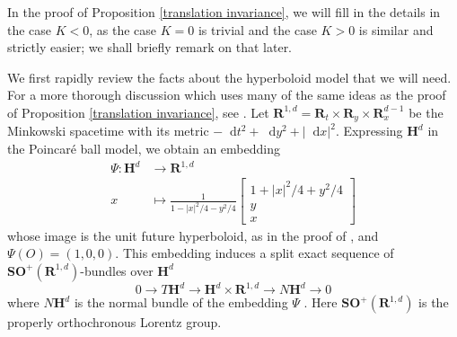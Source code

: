 \documentclass[reqno,10pt]{amsart}
\newcommand{\RR}{\mathbf{R}}
\newcommand{\Hyp}{\mathbf H}
\newcommand{\SpOrth}{\mathbf{SO}}
\newcommand*\dif{\mathop{}\!\mathrm{d}}
\theoremstyle{definition}
\numberwithin{equation}{section}
\begin{document}
In the proof of Proposition \ref{translation invariance}, we will fill in the details in the case $K < 0$, as the case $K = 0$ is trivial and the case $K > 0$ is similar and strictly easier; we shall briefly remark on that later.

We first rapidly review the facts about the hyperboloid model that we will need.
For a more thorough discussion which uses many of the same ideas as the proof of Proposition \ref{translation invariance}, see \cite[\S3.1, \S4.1]{daskalopoulosPrep1}.
Let $\RR^{1, d} = \RR_t \times \RR_y \times \RR_x^{d - 1}$ be the Minkowski spacetime with its metric $-\dif t^2 + \dif y^2 + |\dif x|^2$.
Expressing $\Hyp^d$ in the Poincar\'e ball model, we obtain an embedding
\begin{align*}
\Psi: \Hyp^d &\to \RR^{1, d} \\
x &\mapsto \frac{1}{1 - |x|^2/4 - y^2/4} \begin{bmatrix}1 + |x|^2/4 + y^2/4\\y \\ x\end{bmatrix}
\end{align*}
whose image is the unit future hyperboloid, as in the proof of \cite[Proposition 3.5]{lee1997riemannian}, and $\Psi(O) = (1, 0, 0)$.
This embedding induces a split exact sequence of $\SpOrth^+(\RR^{1, d})$-bundles over $\Hyp^d$
\begin{equation}\label{splitting of tangent bundle}
0 \to T\Hyp^d \to \Hyp^d \times \RR^{1, d} \to N\Hyp^d \to 0
\end{equation}
where $N\Hyp^d$ is the normal bundle of the embedding $\Psi$ \cite[(3.4)]{daskalopoulosPrep1}.
Here $\SpOrth^+(\RR^{1, d})$ is the properly orthochronous Lorentz group.
\end{document}
